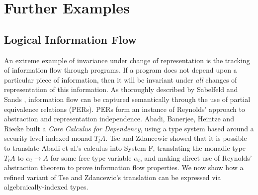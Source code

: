 \section{Further Examples}
\label{sec:further-examples}

\subsection{Logical Information Flow}
\label{sec:information-flow}

An extreme example of invariance under change of representation is the
tracking of information flow through programs. If a program does not
depend upon a particular piece of information, then it will be
invariant under \emph{all} changes of representation of this
information. As thoroughly described by Sabelfeld and Sands
\cite{sabelfeld01per}, information flow can be captured semantically
through the use of partial equivalence relations (PERs). PERs form an
instance of Reynolds' approach to abstraction and representation
independence. Abadi, Banerjee, Heintze and Riecke \cite{abadi99core}
built a \emph{Core Calculus for Dependency}, using a type system based
around a security level indexed monad $T_lA$. Tse and Zdancewic
\cite{tse04translating} showed that it is possible to translate Abadi
et al.'s calculus into System F, translating the monadic type $T_lA$
to $\alpha_l \to A$ for some free type variable $\alpha_l$, and making
direct use of Reynolds' abstraction theorem to prove information flow
properties. We now show how a refined variant of Tse and Zdancewic's
translation can be expressed via algebraically-indexed types.

